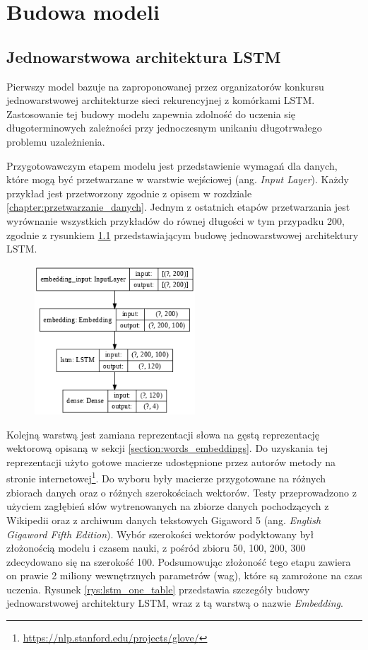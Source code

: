 \chapter{Budowa modeli}

\section{Jednowarstwowa architektura LSTM}
\label{section:one_lstm}

Pierwszy model bazuje na zaproponowanej przez organizatorów konkursu jednowarstwowej architekturze sieci rekurencyjnej z komórkami LSTM. Zastosowanie tej budowy modelu zapewnia zdolność do uczenia się długoterminowych zależności przy jednoczesnym unikaniu długotrwałego problemu uzależnienia. 

Przygotowawczym etapem modelu jest przedstawienie wymagań dla danych, które mogą być przetwarzane w warstwie wejściowej (ang. \textit{Input Layer}). Każdy przykład jest przetworzony zgodnie z opisem w rozdziale \ref{chapter:przetwarzanie_danych}. Jednym z ostatnich etapów przetwarzania jest wyrównanie wszystkich przykładów do równej długości w tym przypadku 200, zgodnie z rysunkiem \ref{rys:lstm_one_graph} przedstawiającym budowę jednowarstwowej architektury LSTM.

\begin{figure}[t]
\centering\includegraphics[width=6cm]{figures/reports/lstm_one_graph.png}
\label{rys:lstm_one_graph}
\end{figure}

Kolejną warstwą jest zamiana reprezentacji słowa na gęstą reprezentację wektorową opisaną w sekcji \ref{section:words_embeddings}. Do uzyskania tej reprezentacji użyto gotowe macierze udostępnione przez autorów metody na stronie internetowej\footnote{\url{https://nlp.stanford.edu/projects/glove/}}. Do wyboru były macierze przygotowane na różnych zbiorach danych oraz o różnych szerokościach wektorów. Testy przeprowadzono z użyciem zagłębień słów wytrenowanych na zbiorze danych pochodzących z Wikipedii oraz z archiwum danych tekstowych Gigaword 5 (ang. \textit{English Gigaword Fifth Edition}). Wybór szerokości wektorów podyktowany był złożonością modelu i czasem nauki, z pośród zbioru 50, 100, 200, 300 zdecydowano się na szerokość 100. Podsumowując złożoność tego etapu zawiera on prawie 2 miliony wewnętrznych parametrów (wag), które są zamrożone na czas uczenia. Rysunek \ref{rys:lstm_one_table} przedstawia szczegóły budowy jednowarstwowej architektury LSTM, wraz z tą warstwą o nazwie \textit{Embedding}.

